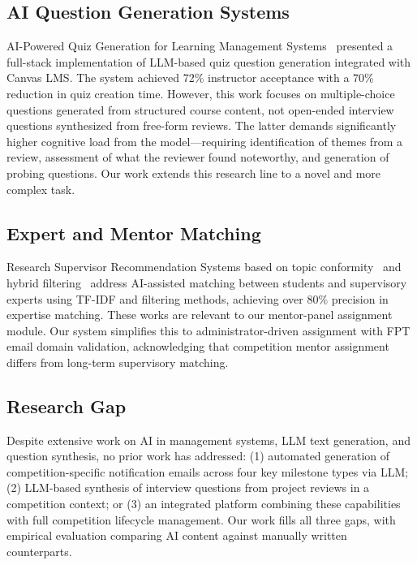 \documentclass[runningheads]{llncs}
\begin{document}
\subsection{AI Question Generation Systems}

AI-Powered Quiz Generation for Learning Management Systems~\cite{ref_quiz_gen} presented a full-stack implementation of LLM-based quiz question generation integrated with Canvas LMS. The system achieved 72\% instructor acceptance with a 70\% reduction in quiz creation time. However, this work focuses on multiple-choice questions generated from structured course content, not open-ended interview questions synthesized from free-form reviews. The latter demands significantly higher cognitive load from the model---requiring identification of themes from a review, assessment of what the reviewer found noteworthy, and generation of probing questions. Our work extends this research line to a novel and more complex task.

\subsection{Expert and Mentor Matching}

Research Supervisor Recommendation Systems based on topic conformity~\cite{ref_supervisor1} and hybrid filtering~\cite{ref_supervisor2} address AI-assisted matching between students and supervisory experts using TF-IDF and filtering methods, achieving over 80\% precision in expertise matching. These works are relevant to our mentor-panel assignment module. Our system simplifies this to administrator-driven assignment with FPT email domain validation, acknowledging that competition mentor assignment differs from long-term supervisory matching.

\subsection{Research Gap}

Despite extensive work on AI in management systems, LLM text generation, and question synthesis, no prior work has addressed: (1) automated generation of competition-specific notification emails across four key milestone types via LLM; (2) LLM-based synthesis of interview questions from project reviews in a competition context; or (3) an integrated platform combining these capabilities with full competition lifecycle management. Our work fills all three gaps, with empirical evaluation comparing AI content against manually written counterparts.
\end{document}
